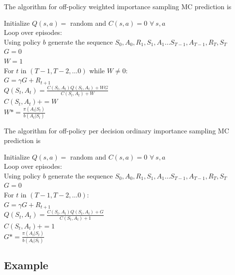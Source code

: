 \documentclass[11pt,a4paper]{article}
\begin{document}
The algorithm for off-policy weighted importance sampling MC prediction is

\begin{tcolorbox}[enhanced,title=Off-policy weighted importance sampling prediction]
Initialize $Q(s,a)=$ random and $C(s,a)=0$ $\forall~s,a$ \\
Loop over episodes: \\
 \phantom{abcd} Using policy $b$ generate the sequence  $S_0,A_0, R_1,S_1,A_1 \dots S_{T-1}, A_{T-1},R_T,S_T$ \\
 \phantom{abcd} $G=0$ \\
  \phantom{abcd} $W=1$ \\
  \phantom{abcd} For $t$ in $(T-1,T-2,\dots 0)$ while $W \ne 0$: \\
  \phantom{abcd}   \phantom{abcd}  $G = \gamma G + R_{t+1}$ \\
  \phantom{abcd}   \phantom{abcd}  $Q(S_t,A_t) = \frac{C(S_t,A_t) Q(S_t,A_t) +W G}{C(S_t,A_t)+W}$ \\
    \phantom{abcd}   \phantom{abcd}  $C(S_t,A_t) += W$ \\
    \phantom{abcd}   \phantom{abcd}  $W*= \frac{\pi(A_t|S_t)}{b(A_t|S_t)}$   
\end{tcolorbox}
The algorithm for off-policy per decision ordinary importance sampling MC prediction is

\begin{tcolorbox}[enhanced,title=Off-policy per decision ordinary importance sampling prediction]
Initialize $Q(s,a)=$ random and $C(s,a)=0$ $\forall~s,a$ \\
Loop over episodes: \\
 \phantom{abcd} Using policy $b$ generate the sequence  $S_0,A_0, R_1,S_1,A_1 \dots S_{T-1}, A_{T-1},R_T,S_T$ \\
 \phantom{abcd} $G=0$ \\
  \phantom{abcd} For $t$ in $(T-1,T-2,\dots 0)$: \\
  \phantom{abcd}   \phantom{abcd}  $G = \gamma G + R_{t+1}$ \\
  \phantom{abcd}   \phantom{abcd}  $Q(S_t,A_t) = \frac{C(S_t,A_t) Q(S_t,A_t) + G}{C(S_t,A_t)+1}$ \\
    \phantom{abcd}   \phantom{abcd}  $C(S_t,A_t) += 1$ \\
    \phantom{abcd}   \phantom{abcd}  $G*= \frac{\pi(A_t|S_t)}{b(A_t|S_t)}$   
\end{tcolorbox}

\subsection{Example}
\end{document}
